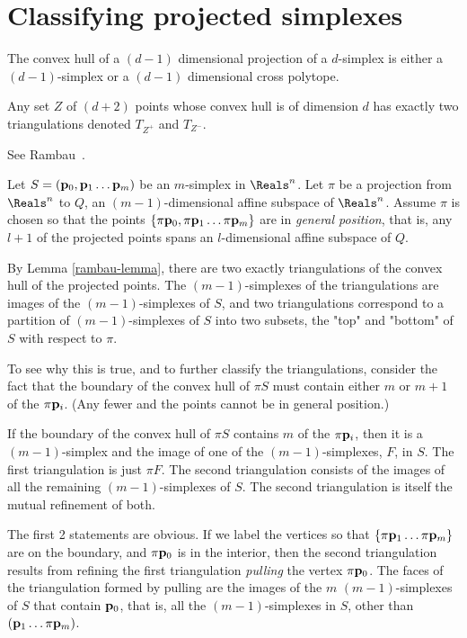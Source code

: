 \section{Classifying projected simplexes}
\label{sec:classifying}


The convex hull of a $(d-1)$ dimensional projection of a $d$-simplex
is either a $(d-1)$-simplex or a $(d-1)$ dimensional cross polytope.

\begin{Lemma}
\label{rambau-lemma}
Any set $Z$ of $(d+2)$ points whose convex hull is of dimension $d$
has exactly two triangulations denoted $T_{Z^+}$ and $T_{Z^-}$.
\end{Lemma}

See Rambau~\cite[Lemma~1.1.2]{rambau-jorg-1996}.

Let $S=({\mathbf p}_0, {\mathbf p}_1 \ldots  {\mathbf p}_m)$ be an $m$-simplex in $\Reals^{n}$.
Let $\pi$ be a projection from $\Reals^{n}$ to $Q$, an $(m-1)$-dimensional
affine subspace of $\Reals^{n}$.
Assume $\pi$ is chosen so that the points
$\{\pi {\mathbf p}_0, \pi {\mathbf p}_1 \ldots  \pi {\mathbf p}_m\}$ are in {\it general position},
that is, any $l+1$ of the projected points spans an $l$-dimensional
affine subspace of $Q$.

By Lemma \ref{rambau-lemma},
there are two exactly triangulations of the convex hull of the projected points.
The $(m-1)$-simplexes of the triangulations are images of the $(m-1)$-simplexes of $S$,
and two triangulations correspond to a partition of $(m-1)$-simplexes of $S$
into two subsets, the "top" and "bottom" of $S$ with respect to $\pi$.

To see why this is true, and to further classify the triangulations,
consider the fact that the boundary of the convex hull of $\pi S$
must contain either $m$ or $m+1$ of the $\pi {\mathbf p}_i$.
(Any fewer and the points cannot be in general position.)

\begin{Theorem}
\label{one-simplex-case}
If the boundary of the convex hull of $\pi S$
contains $m$ of the $\pi {\mathbf p}_i$,
then it is a $(m-1)$-simplex
and the image of one of the $(m-1)$-simplexes, $F$, in $S$.
The first triangulation is just $\pi F$.
The second triangulation consists of the images of
all the remaining $(m-1)$-simplexes of $S$.
The second triangulation is itself the mutual refinement of both.
\end{Theorem}

The first 2 statements are obvious.
If we label the vertices so that $\{\pi {\mathbf p}_1 \ldots  \pi {\mathbf p}_m\}$
are on the boundary, and $\pi {\mathbf p}_0$ is in the interior,
then the second triangulation results from refining the first
triangulation {\it pulling}
\cite{lee-hdcg-2004} the vertex $\pi {\mathbf p}_0$.
The faces of the triangulation formed by pulling
are the images of the $m$ $(m-1)$-simplexes
of $S$ that contain ${\mathbf p}_0$, that is, all the $(m-1)$-simplexes in $S$,
other than $({\mathbf p}_1 \ldots  \pi {\mathbf p}_m)$.

